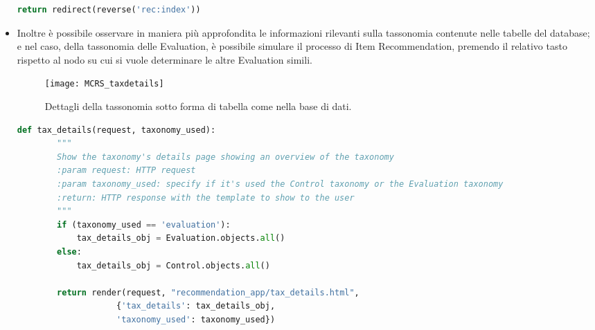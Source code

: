 \begin{itemize}
\begin{lstlisting}[language=Python, label=lst:view_DOT_eval, caption={Codice utilizzato per la realizzazione del
        file .dot e relativa immagine .}]
        return redirect(reverse('rec:index'))
    \end{lstlisting}
    \item Inoltre è possibile osservare in maniera più approfondita le informazioni rilevanti sulla tassonomia contenute nelle 
    tabelle del database; e nel caso, della tassonomia delle Evaluation, è possibile simulare il processo di Item Recommendation, 
    premendo il relativo tasto rispetto al nodo su cui si vuole determinare le altre Evaluation simili.
    \begin{figure}[ht!]
        \centering
        \texttt{[image: MCRS\_taxdetails]}
        \caption[Dettagli della tassonomia sotto forma di tabella]{Dettagli della tassonomia sotto forma di tabella come nella base di dati.}
        \label{fig:MCRS_taxdetails}
    \end{figure}
    \lstset{style=python_code_style}
    \begin{lstlisting}[language=Python, label=lst:view_taxdetails, caption={Codice utilizzato per la realizzazione della View che 
        implementa la pagina web del dettaglio della Tassonomia.}]
    def tax_details(request, taxonomy_used):
        """
        Show the taxonomy's details page showing an overview of the taxonomy
        :param request: HTTP request
        :param taxonomy_used: specify if it's used the Control taxonomy or the Evaluation taxonomy
        :return: HTTP response with the template to show to the user
        """
        if (taxonomy_used == 'evaluation'):
            tax_details_obj = Evaluation.objects.all()
        else:
            tax_details_obj = Control.objects.all()
 
        return render(request, "recommendation_app/tax_details.html",
                    {'tax_details': tax_details_obj,
                    'taxonomy_used': taxonomy_used})
    \end{lstlisting}
\end{itemize}
%
\newpage
%
